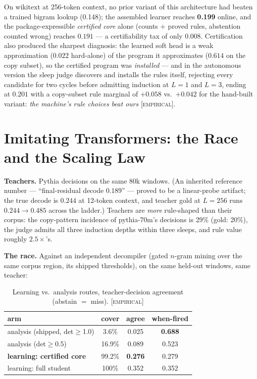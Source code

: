 \documentclass[sigconf,nonacm]{acmart}
\newcommand{\tagp}[1]{\textsc{\small[#1]}}
\begin{document}
On wikitext at 256-token context, no prior variant of this architecture had beaten a trained
bigram lookup (0.148); the assembled learner reaches \textbf{0.199} online, and the
package-expressible \emph{certified core} alone (counts $+$ proved rules, abstention counted
wrong) reaches $0.191$ --- a certifiability tax of only $0.008$. Certification also produced the
sharpest diagnosis: the learned soft head is a weak approximation ($0.022$ hard-alone) of the
program it approximates ($0.614$ on the copy subset), so the certified program was
\emph{installed} --- and in the autonomous version the sleep judge discovers and installs the
rules itself, rejecting every candidate for two cycles before admitting induction at $L{=}1$ and
$L{=}3$, ending at $0.201$ with a copy-subset rule marginal of $+0.058$ vs.\ $+0.042$ for the
hand-built variant: \emph{the machine's rule choices beat ours} \tagp{empirical}.

\section{Imitating Transformers: the Race and the Scaling Law}
\label{sec:race}

\textbf{Teachers.} Pythia decisions on the same 80k windows. (An inherited reference number ---
``final-residual decode $0.189$'' --- proved to be a linear-probe artifact; the true decode is
$0.244$ at 12-token context, and teacher gold at $L{=}256$ runs $0.244\!\to\!0.485$ across the
ladder.) Teachers are \emph{more} rule-shaped than their corpus: the copy-pattern incidence of
pythia-70m's decisions is 29\% (gold: 20\%), the judge admits all three induction depths within
three sleeps, and rule value roughly $2.5\times$'s.

\textbf{The race.} Against an independent decompiler (gated $n$-gram mining over the same corpus
region, its shipped thresholds), on the same held-out windows, same teacher:

\begin{table}[h]
\caption{Learning vs.\ analysis routes, teacher-decision agreement (abstain $=$ miss).
\tagp{empirical}}
\label{tab:race}
\small
\begin{tabular}{lccc}
\toprule
arm & cover & agree & when-fired \\
\midrule
analysis (shipped, det$\ge$1.0) & 3.6\% & 0.025 & \textbf{0.688} \\
analysis (det$\ge$0.5) & 16.9\% & 0.089 & 0.523 \\
\textbf{learning: certified core} & 99.2\% & \textbf{0.276} & 0.279 \\
learning: full student & 100\% & 0.352 & 0.352 \\
\bottomrule
\end{tabular}
\end{table}
\end{document}
